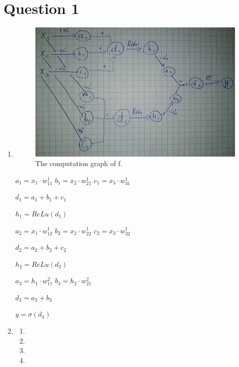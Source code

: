 \documentclass{article}
\begin{document}
\section*{Question 1} 
\begin{enumerate}[label = (\alph*)]
    \item
    
\begin{figure}[h!]
    \centering
    \includegraphics[scale=1.5]{figures/backprop.jpg}
    \caption{The computation graph of f.}
    \label{fig:roller-coaster}
\end{figure}

$a_1 = x_1 \cdot w_{11}^1$
$b_1 = x_2 \cdot w_{21}^1$
$c_1 = x_3 \cdot w_{31}^1$

$d_1=a_1 + b_1 + c_1$

$h_1 = ReLu(d_1)$

$a_2 = x_1 \cdot w_{12}^1$
$b_2 = x_2 \cdot w_{22}^1$
$c_2 = x_3 \cdot w_{32}^1$

$d_2=a_2 + b_2 + c_2$

$h_2 = ReLu(d_2)$

$a_3 = h_1 \cdot w_{11}^2$
$b_3 = h_2 \cdot w_{21}^2$

$d_3=a_3 + b_3$

$y=\sigma(d_3)$

\item 
	\begin{enumerate}[label = (\roman*)]
		\item
		
		\item
		
		\item
		
		\item
		
	\end{enumerate}

\end{enumerate}
\end{document}
